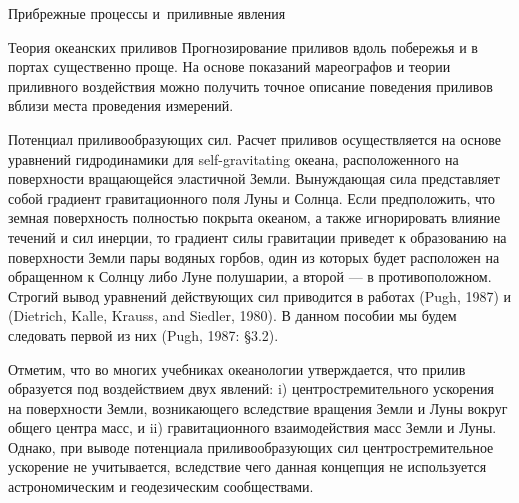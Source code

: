 \begin{chapter}{Прибрежные процессы и~приливные явления}
\begin{section}{Теория океанских приливов}
Прогнозирование приливов вдоль побережья и в портах существенно проще.
На основе показаний мареографов и теории приливного воздействия
можно получить точное описание поведения приливов вблизи места проведения
измерений.
%

\begin{paragraph}{Потенциал приливообразующих сил.}
Расчет приливов осуществляется
на основе уравнений гидродинамики для self-gravitating океана,
расположенного на поверхности вращающейся эластичной Земли.
Вынуждающая сила представляет собой градиент гравитационного поля 
Луны и Солнца. Если предположить, что земная поверхность 
полностью покрыта океаном, а также игнорировать влияние течений и сил инерции,
то градиент силы гравитации приведет к образованию на поверхности Земли
пары водяных горбов, один из которых будет расположен на обращенном к Солнцу
либо Луне полушарии, а второй --- в противоположном. Строгий вывод уравнений
действующих сил приводится в работах (Pugh, 1987) 
и (Dietrich, Kalle, Krauss, and Siedler, 1980). 
В данном пособии мы будем следовать первой из них (Pugh, 1987: \S 3.2).
%

Отметим, что во многих учебниках океанологии утверждается, что прилив
образуется под воздействием двух явлений:
i) центростремительного ускорения на поверхности Земли, возникающего 
вследствие вращения Земли и Луны вокруг общего центра масс, и
ii) гравитационного взаимодействия масс Земли и Луны. 
Однако, при выводе потенциала приливообразующих сил центростремительное
ускорение не учитывается, вследствие чего данная концепция не используется
астрономическим и геодезическим сообществами.
%


\end{paragraph}
\end{section}
\end{chapter}
